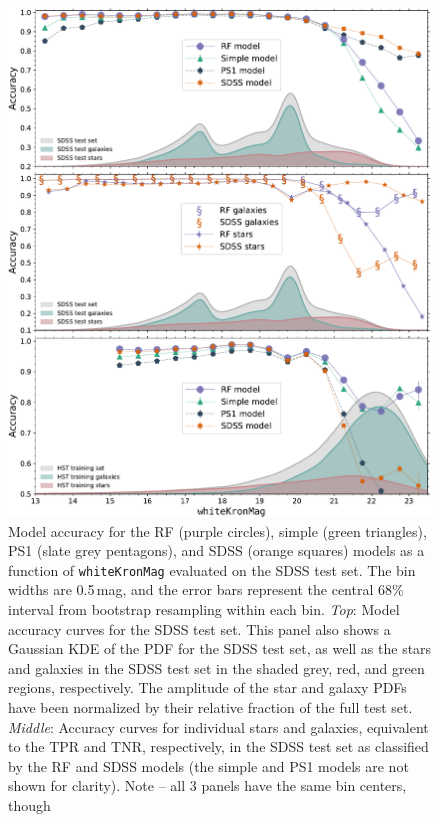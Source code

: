 \documentclass[twocolumn, dvipdfmx]{aastex62}
\begin{document}
\begin{figure}[htb]
 \centering
  \includegraphics[width=6.2in]{./Figures/SDSS_acc_mag.pdf}
  \caption{ Model accuracy for the RF (purple circles), simple (green
  triangles), PS1 (slate grey pentagons), and SDSS (orange squares) models
  as a function of \texttt{whiteKronMag} evaluated on the SDSS test set. The
  bin widths are 0.5\,mag, and the error bars represent the central 68\%
  interval from bootstrap resampling within each bin.
  \textit{Top}: Model accuracy curves for the SDSS test set. This panel also
  shows a Gaussian KDE of the PDF for the SDSS test set, as well as the
  stars and galaxies in the SDSS test set in the shaded grey, red, and green
  regions, respectively. The amplitude of the star and galaxy PDFs have been
  normalized by their relative fraction of the full test set.
  \textit{Middle}: Accuracy curves for individual stars and galaxies,
  equivalent to the TPR and TNR, respectively, in the SDSS test set as
  classified by the RF and SDSS models (the simple and PS1 models are not
  shown for clarity). Note -- all 3 panels have the same bin centers, though
}
\end{figure}
\end{document}
